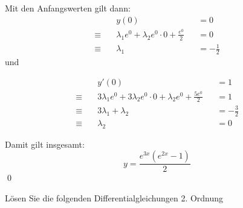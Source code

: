 \documentclass[answers]{exam}
\begin{document}
\begin{questions}
\begin{solution}
        \newpage
        Mit den Anfangswerten gilt dann:
        $$
            \begin{aligned}
                             & y(0)                                                  &  & = 0             \\
                \equiv \quad & \lambda_1 e^0 + \lambda_2 e^0 \cdot 0 + \frac{e^0}{2} &  & = 0             \\
                \equiv \quad & \lambda_1                                             &  & = - \frac{1}{2}
            \end{aligned}
        $$
        und

        $$
            \begin{aligned}
                             & y'(0)                                                                         &  & = 1            \\
                \equiv \quad & 3\lambda_1e^{0} + 3\lambda_2e^{0} \cdot 0 + \lambda_2e^{0} + \frac{5e^{0}}{2} &  & = 1            \\
                \equiv \quad & 3 \lambda_1 + \lambda_2                                                       &  & = -\frac{3}{2} \\
                \equiv \quad & \lambda_2                                                                     &  & = 0
            \end{aligned}
        $$

        Damit gilt insgesamt:
        $$
            y = \frac{e^{3x}\left( e^{2x} - 1 \right)}{2}
        $$\qed
    \end{solution}

    \newpage
    \question
    Lösen Sie die folgenden Differentialgleichungen 2. Ordnung
\end{questions}
\end{document}
